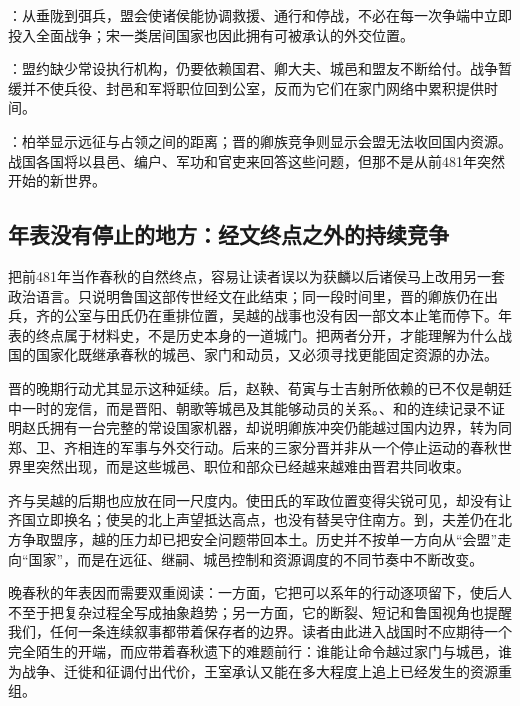 \begin{turningpoint}
：从垂陇到弭兵，盟会使诸侯能协调救援、通行和停战，不必在每一次争端中立即投入全面战争；宋一类居间国家也因此拥有可被承认的外交位置。

：盟约缺少常设执行机构，仍要依赖国君、卿大夫、城邑和盟友不断给付。战争暂缓并不使兵役、封邑和军将职位回到公室，反而为它们在家门网络中累积提供时间。

：柏举显示远征与占领之间的距离；晋的卿族竞争则显示会盟无法收回国内资源。战国各国将以县邑、编户、军功和官吏来回答这些问题，但那不是从前481年突然开始的新世界。
\end{turningpoint}

\subsection{年表没有停止的地方：经文终点之外的持续竞争}

把前481年当作春秋的自然终点，容易让读者误以为获麟以后诸侯马上改用另一套政治语言。只说明鲁国这部传世经文在此结束；同一段时间里，晋的卿族仍在出兵，齐的公室与田氏仍在重排位置，吴越的战事也没有因一部文本止笔而停下。年表的终点属于材料史，不是历史本身的一道城门。把两者分开，才能理解为什么战国的国家化既继承春秋的城邑、家门和动员，又必须寻找更能固定资源的办法。

晋的晚期行动尤其显示这种延续。后，赵鞅、荀寅与士吉射所依赖的已不仅是朝廷中一时的宠信，而是晋阳、朝歌等城邑及其能够动员的关系。、和的连续记录不证明赵氏拥有一台完整的常设国家机器，却说明卿族冲突仍能越过国内边界，转为同郑、卫、齐相连的军事与外交行动。后来的三家分晋并非从一个停止运动的春秋世界里突然出现，而是这些城邑、职位和部众已经越来越难由晋君共同收束。

齐与吴越的后期也应放在同一尺度内。使田氏的军政位置变得尖锐可见，却没有让齐国立即换名；使吴的北上声望抵达高点，也没有替吴守住南方。到，夫差仍在北方争取盟序，越的压力却已把安全问题带回本土。历史并不按单一方向从“会盟”走向“国家”，而是在远征、继嗣、城邑控制和资源调度的不同节奏中不断改变。

晚春秋的年表因而需要双重阅读：一方面，它把可以系年的行动逐项留下，使后人不至于把复杂过程全写成抽象趋势；另一方面，它的断裂、短记和鲁国视角也提醒我们，任何一条连续叙事都带着保存者的边界。读者由此进入战国时不应期待一个完全陌生的开端，而应带着春秋遗下的难题前行：谁能让命令越过家门与城邑，谁为战争、迁徙和征调付出代价，王室承认又能在多大程度上追上已经发生的资源重组。
